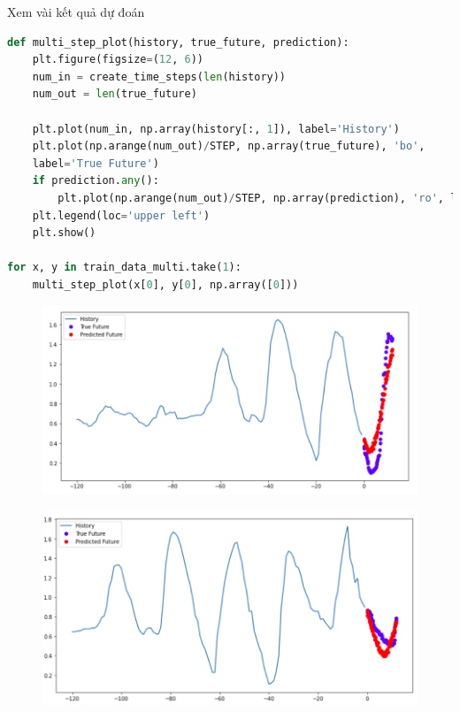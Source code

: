 Xem vài kết quả dự đoán

\begin{lstlisting}[language=Python]
def multi_step_plot(history, true_future, prediction):
	plt.figure(figsize=(12, 6))
	num_in = create_time_steps(len(history))
	num_out = len(true_future)
	
	plt.plot(num_in, np.array(history[:, 1]), label='History')
	plt.plot(np.arange(num_out)/STEP, np.array(true_future), 'bo',
	label='True Future')
	if prediction.any():
		plt.plot(np.arange(num_out)/STEP, np.array(prediction), 'ro', label='Predicted Future')
	plt.legend(loc='upper left')
	plt.show()

for x, y in train_data_multi.take(1):
	multi_step_plot(x[0], y[0], np.array([0]))
\end{lstlisting}

\begin{center}
	\begin{figure}[htp]
		\begin{center}
			\includegraphics[scale=0.49]{./images/12.png}
		\end{center}
	\end{figure}
\end{center}


\begin{center}
	\begin{figure}[htp]
		\begin{center}
			\includegraphics[scale=0.49]{./images/13.png}
		\end{center}
	\end{figure}
\end{center}


